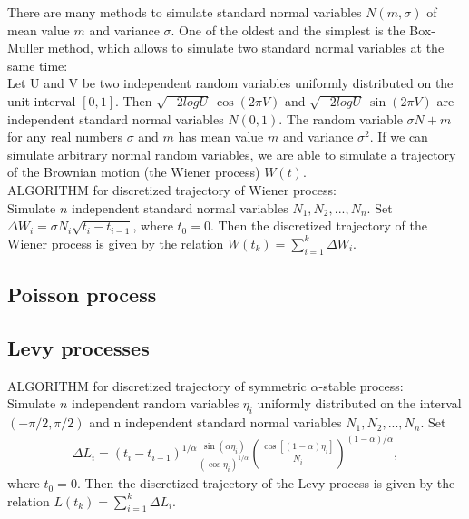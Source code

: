 \documentclass[authoryear,draft,1p,times]{elsarticle}
\newcommand{\bea}{\begin{eqnarray}}
\newcommand{\eea}{\end{eqnarray}}
\renewcommand{\=}{\stackrel{\mathrm{d}}{=}}
\begin{document}
There are many methods to simulate standard normal variables $N(m, \sigma)$  of mean value $m$ and variance $\sigma$.  One of the 
oldest and the simplest is the Box-Muller method, which allows to simulate two standard normal variables at the same time: \\
Let U and V be two independent random variables uniformly distributed on the unit interval $[0, 1]$. Then 
$\sqrt{-2 log U} \ \cos(2\pi V)$ and $\sqrt{-2 log U} \ \sin(2\pi V)$ are independent standard normal variables 
$N(0, 1)$.  
The random variable $\sigma N +m$  for any real  numbers $\sigma$ and $m$ has mean value $m$ and variance $\sigma^2$.  
If we can simulate arbitrary normal  random variables,  we are able to simulate a trajectory of the Brownian motion 
(the Wiener process) $W(t)$.  \\
ALGORITHM for discretized trajectory of Wiener process:  \\
 Simulate $n$ independent standard normal variables $N_1, N_2, ..., N_n$. Set 
$\Delta W_i  = \sigma N_i \sqrt{t_i - t_{i-1}}$, where $t_0=0$. Then the discretized trajectory of the Wiener process is given by the relation $W(t_k) = \sum_{i=1}^k \Delta W_i$. 

\subsection{Poisson process}


\subsection{Levy processes}

ALGORITHM for discretized trajectory of  symmetric $\alpha$-stable  process:  \\
 Simulate $n$ independent  random variables $\eta_i$  uniformly distributed on the interval $(-\pi/2, \pi/2)$ and n independent standard normal variables $N_1, N_2, ..., N_n$. Set 
%
\bea
\label{alfa}
\Delta L_i  = (t_i - t_{i-1})^{1/\alpha} \frac{\sin(\alpha \eta_i)}{(\cos \eta_i)^{1/\alpha}} 
\left(\frac{ \cos [ (1-\alpha) \eta_i]}{N_i}\right)^{(1-\alpha)/\alpha},  
\eea
%
where $t_0=0$. Then the discretized trajectory of the  Levy process is given by the relation 
$L(t_k) = \sum_{i=1}^k \Delta L_i$. 




\end{document}
